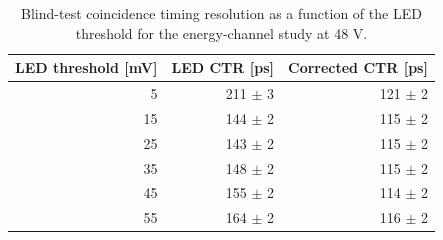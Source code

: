 \begin{table}[htbp]
\centering
\small
\begin{tabular}{rrr}
\toprule
LED threshold [mV] & LED CTR [ps] & Corrected CTR [ps] \\
\midrule
5 & 211 $\pm$ 3 & 121 $\pm$ 2 \\
15 & 144 $\pm$ 2 & 115 $\pm$ 2 \\
25 & 143 $\pm$ 2 & 115 $\pm$ 2 \\
35 & 148 $\pm$ 2 & 115 $\pm$ 2 \\
45 & 155 $\pm$ 2 & 114 $\pm$ 2 \\
55 & 164 $\pm$ 2 & 116 $\pm$ 2 \\
\bottomrule
\end{tabular}
\caption{Blind-test coincidence timing resolution as a function of the LED threshold for the energy-channel study at 48 V.}
\label{tab:fbk-energy-threshold-scan}
\end{table}
